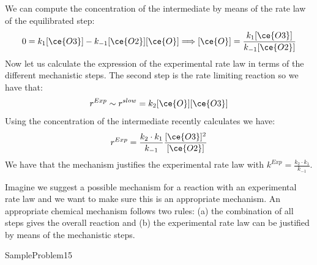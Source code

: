 \documentclass[main.tex]{subfiles}
\newcommand\chapterlabel{Ch-kinetics}
\begin{document}
\begin{description}
We can compute the concentration of the intermediate by means of the rate law of the equilibrated step:
\[0=k_1[\ce{O3}]-k_{-1}[\ce{O2}][\ce{O}] \Longrightarrow	[\ce{O}]=\frac{k_1[\ce{O3}]}{k_{-1}[\ce{O2}]}\]
Now let us calculate the expression of the experimental rate law in terms of the different mechanistic steps. 
The second step is the rate limiting reaction so we have that:
 \[r^{Exp}\sim r^{slow}=k_2[\ce{O}][\ce{O3}]\]
Using the concentration of the intermediate recently calculates we have:
 \[r^{Exp}=\frac{k_2\cdot k_1}{k_{-1}}\frac{[\ce{O3}]^2}{[\ce{O2}]}\]
 We have that the mechanism justifies the experimental rate law with $k^{Exp}=\frac{k_2\cdot k_1}{k_{-1}}$.
 \item[\docfilehook{How to verify a possible mechanism }{}] 
Imagine we suggest a possible mechanism for a reaction with an experimental rate law and we want to make sure this is an appropriate mechanism. An appropriate chemical mechanism follows two rules: (a) the combination of all steps gives the overall reaction and (b) the experimental rate law can be justified by means of the mechanistic steps.

  {SampleProblem15}
  



\end{description}
 \clearpage\thispagestyle{empty}\mbox{}
\end{document}
